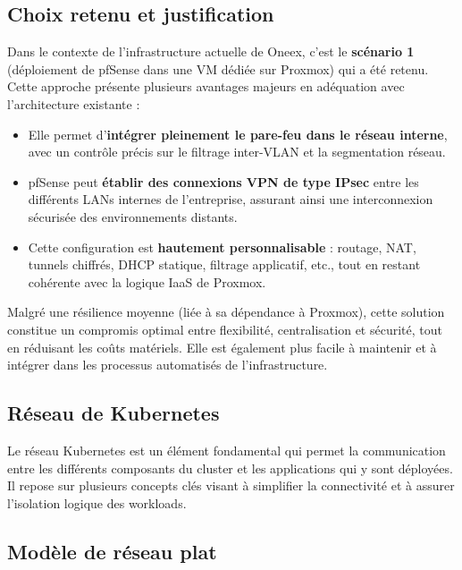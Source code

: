 \subsection{Choix retenu et justification}

Dans le contexte de l’infrastructure actuelle de Oneex, c’est le \textbf{scénario 1} (déploiement de pfSense dans une VM dédiée sur Proxmox) qui a été retenu. Cette approche présente plusieurs avantages majeurs en adéquation avec l’architecture existante :

\begin{itemize}
	\item Elle permet d’\textbf{intégrer pleinement le pare-feu dans le réseau interne}, avec un contrôle précis sur le filtrage inter-VLAN et la segmentation réseau.
	\item pfSense peut \textbf{établir des connexions VPN de type IPsec} entre les différents LANs internes de l’entreprise, assurant ainsi une interconnexion sécurisée des environnements distants.
	\item Cette configuration est \textbf{hautement personnalisable} : routage, NAT, tunnels chiffrés, DHCP statique, filtrage applicatif, etc., tout en restant cohérente avec la logique IaaS de Proxmox.
\end{itemize}

Malgré une résilience moyenne (liée à sa dépendance à Proxmox), cette solution constitue un compromis optimal entre flexibilité, centralisation et sécurité, tout en réduisant les coûts matériels. Elle est également plus facile à maintenir et à intégrer dans les processus automatisés de l'infrastructure.

\subsection{Réseau de Kubernetes}

Le réseau Kubernetes est un élément fondamental qui permet la communication entre les différents composants du cluster et les applications qui y sont déployées. Il repose sur plusieurs concepts clés visant à simplifier la connectivité et à assurer l’isolation logique des workloads.

\subsection{Modèle de réseau plat}

